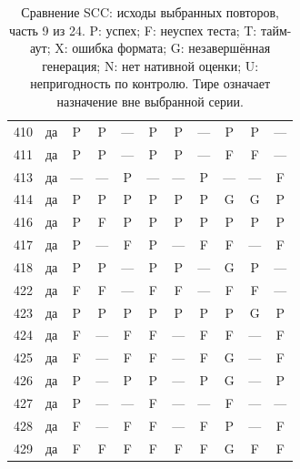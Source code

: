 \begin{table}[p]
\begin{tabular*}{\textwidth}{@{\extracolsep{\fill}}rc*{9}{c}@{}}
410 & да & P & P & — & P & P & — & P & P & —\\
411 & да & P & P & — & P & P & — & F & F & —\\
413 & да & — & — & P & — & — & P & — & — & F\\
414 & да & P & P & P & P & P & P & G & G & P\\
416 & да & P & F & P & P & P & P & P & P & P\\
417 & да & P & — & F & P & — & F & F & — & F\\
418 & да & P & P & — & P & P & — & G & P & —\\
422 & да & F & F & — & F & F & — & F & F & —\\
423 & да & P & P & P & P & P & P & P & G & P\\
424 & да & F & — & F & F & — & F & F & — & F\\
425 & да & F & — & F & F & — & F & G & — & F\\
426 & да & P & — & P & P & — & P & G & — & P\\
427 & да & P & — & — & F & — & — & F & — & —\\
428 & да & F & — & F & F & — & F & P & — & F\\
429 & да & F & F & F & F & F & F & G & F & F\\
\bottomrule\end{tabular*}
\caption{Сравнение SCC: исходы выбранных повторов, часть 9 из 24. P: успех; F: неуспех теста; T: тайм-аут; X: ошибка формата; G: незавершённая генерация; N: нет нативной оценки; U: непригодность по контролю. Тире означает назначение вне выбранной серии.}
\end{table}
\clearpage
